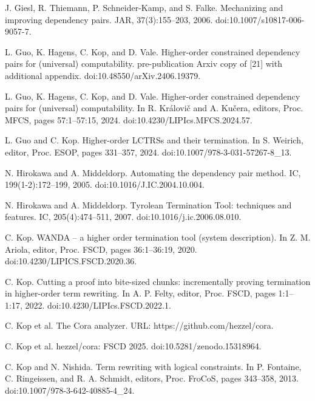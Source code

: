 \par\noindent  [19]  J. Giesl, R. Thiemann, P. Schneider-Kamp, and S. Falke.  Mechanizing and improving dependency pairs.  JAR, 37(3):155–203, 2006.  doi:10.1007/s10817-006-9057-7.  
 
\par\noindent  [20]  L. Guo, K. Hagens, C. Kop, and D. Vale.  Higher-order constrained dependency pairs for (universal) computability.  pre-publication Arxiv copy of [21] with additional appendix.  doi:10.48550/arXiv.2406.19379.  
 
\par\noindent  [21]  L. Guo, K. Hagens, C. Kop, and D. Vale.  Higher-order constrained dependency pairs for (universal) computability.  In R. Královič and A. Kučera, editors, Proc. MFCS, pages 57:1–57:15, 2024.  doi:10.4230/LIPIcs.MFCS.2024.57.  
 
\par\noindent  [22]  L. Guo and C. Kop.  Higher-order LCTRSs and their termination.  In S. Weirich, editor, Proc. ESOP, pages 331–357, 2024.  doi:10.1007/978-3-031-57267-8\_13.  
 
\par\noindent  [23]  N. Hirokawa and A. Middeldorp.  Automating the dependency pair method.  IC, 199(1-2):172–199, 2005.  doi:10.1016/J.IC.2004.10.004.  
 
\par\noindent  [24]  N. Hirokawa and A. Middeldorp.  Tyrolean Termination Tool: techniques and features.  IC, 205(4):474–511, 2007.  doi:10.1016/j.ic.2006.08.010.  
 
\par\noindent  [25]  C. Kop.  WANDA – a higher order termination tool (system description).  In Z. M. Ariola, editor, Proc. FSCD, pages 36:1–36:19, 2020.  doi:10.4230/LIPICS.FSCD.2020.36.  
 
\par\noindent  [26]  C. Kop.  Cutting a proof into bite-sized chunks: incrementally proving termination in higher-order term rewriting.  In A. P. Felty, editor, Proc. FSCD, pages 1:1–1:17, 2022.  doi:10.4230/LIPIcs.FSCD.2022.1.  
 
\par\noindent  [27]  C. Kop et al.  The Cora analyzer.  URL: https://github.com/hezzel/cora.  
 
\par\noindent  [28]  C. Kop et al.  hezzel/cora: FSCD 2025.  doi:10.5281/zenodo.15318964.  
 
\par\noindent  [29]  C. Kop and N. Nishida.  Term rewriting with logical constraints.  In P. Fontaine, C. Ringeissen, and R. A. Schmidt, editors, Proc. FroCoS, pages 343–358, 2013.  doi:10.1007/978-3-642-40885-4\_24.  
 
